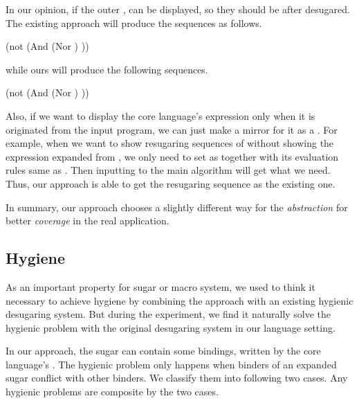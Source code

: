 In our opinion, if the outer ,  can be displayed, so they should be after desugared.
The existing approach will produce the sequences as follows.
\begin{footnotesize}
\begin{Codes}
	\qquad(not (And (Nor \false \true) \true))
\OneStep{ \true}
\end{Codes}
\end{footnotesize}
while ours will produce the following sequences.
\begin{footnotesize}
\begin{Codes}
	\qquad(not (And (Nor \false \true) \true))
\OneStep{ \true}
\end{Codes}
\end{footnotesize}

Also, if we want to display the core language's expression only when it is originated from the input program, we can just make a mirror for it as a . For example, when we want to show resugaring sequences of 
without showing the  expression expanded from , we only need to set  as  together with its evaluation rules same as . Then inputting  to the main algorithm will get what we need. Thus, our approach is able to get the resugaring sequence as the existing one.

In summary, our approach chooses a slightly different way for the \emph{abstraction} for better \emph{coverage} in the real application.
\subsection{Hygiene}
\label{mark:hygiene}
\todo{}

As an important property for sugar or macro system, we used to think it necessary to achieve hygiene by combining the approach with an existing hygienic desugaring system. But during the experiment, we find it naturally solve the hygienic problem with the original desugaring system in our language setting.

In our approach, the sugar can contain some bindings, written by the core language's . The hygienic problem only happens when binders of an expanded sugar conflict with other binders. We classify them into following two cases. Any hygienic problems are composite by the two cases.

